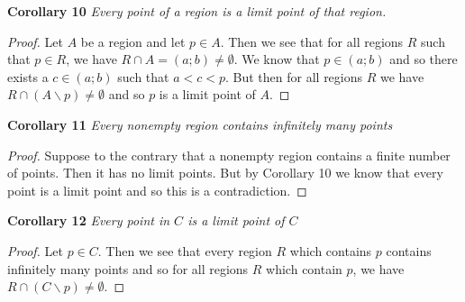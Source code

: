 \documentclass{article}
\begin{document}
\begin{flushleft}
\textbf{Corollary 10}
\textsl{Every point of a region is a limit point of that region.}
\begin{proof}
Let $A$ be a region and let $p \in A$. Then we see that for all regions $R$ such that $p \in R$, we have $R \cap A = (a;b) \neq \emptyset$. We know that $p \in (a;b)$ and so there exists a $c \in (a;b)$ such that $a<c<p$. But then for all regions $R$ we have $R \cap (A \backslash p) \neq \emptyset$ and so $p$ is a limit point of $A$.
\end{proof}

\textbf{Corollary 11}
\textsl{Every nonempty region contains infinitely many points}
\begin{proof}
Suppose to the contrary that a nonempty region contains a finite number of points. Then it has no limit points. But by Corollary 10 we know that every point is a limit point and so this is a contradiction.
\end{proof}

\textbf{Corollary 12}
\textsl{Every point in $C$ is a limit point of $C$}
\begin{proof}
Let $p \in C$. Then we see that every region $R$ which contains $p$ contains infinitely many points and so for all regions $R$ which contain $p$, we have $R \cap (C \backslash p) \neq \emptyset$.
\end{proof}

\end{flushleft}
\end{document}
